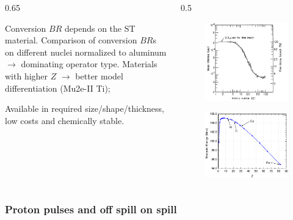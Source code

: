 \documentclass{beamer}
\begin{document}
\begin{frame}
\begin{columns}
\begin{column}{0.65\framewidth}
\begin{itemize}
{\item Conversion $BR$ depends on the ST material. Comparison of conversion $BR$s on different nuclei 
normalized to aluminum $\rightarrow$ dominating 
operator type. Materials with higher $Z$ $\rightarrow$ better model differentiation (Mu2e-II Ti);
\item Available in required size/shape/thickness, low costs and chemically stable.}
    \end{itemize}
\end{column}   
 \begin{column}{0.5\framewidth}
    \begin{figure}[!h]
        \centering
        \includegraphics[width=0.8\columnwidth]{figures/png/lifetime_mu_matter.png}
        \label{fig:muonicatom}
 \end{figure}
       \begin{figure}[!h]
        \centering
        \includegraphics[width=0.8\columnwidth]{figures/png/endopint.png}
        \label{fig:endpoint}
    \label{fig:2imins}
  \end{figure}
\end{column}   
\end{columns}

\end{frame}
\begin{frame}
    \frametitle{Proton pulses and off spill on spill}
\end{frame}
\end{document}
